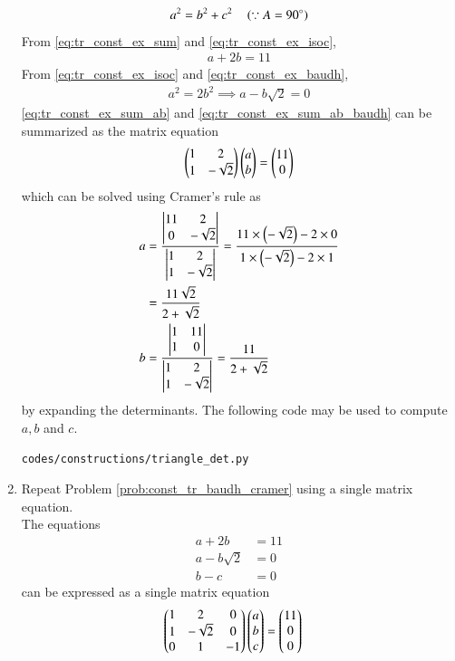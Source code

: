 \begin{enumerate}[label=\arabic*.,ref=\thesubsection.\theenumi]
\begin{align}
a^2 = b^2+c^2 \quad \left(\because A = 90\degree\right)
\label{eq:tr_const_ex_baudh}
\end{align}
%
From \eqref{eq:tr_const_ex_sum} and \eqref{eq:tr_const_ex_isoc},
\begin{align}
\label{eq:tr_const_ex_sum_ab}
a + 2b = 11
\end{align}
From  \eqref{eq:tr_const_ex_isoc} and \eqref{eq:tr_const_ex_baudh},
\begin{align}
\label{eq:tr_const_ex_sum_ab_baudh}
a^2 = 2b^2 \implies a - b\sqrt{2} =0
\end{align}
\eqref{eq:tr_const_ex_sum_ab} and \eqref{eq:tr_const_ex_sum_ab_baudh}
can be summarized as the matrix equation 
\begin{align}
\label{eq:tr_const_ex_sum_ab_mat}
\begin{pmatrix}1 & 2\\1 & -\sqrt{2}\end{pmatrix}\begin{pmatrix}a\\b\end{pmatrix} = \begin{pmatrix}11\\0\end{pmatrix}
\end{align}
%
which can be solved using Cramer's rule as
\begin{align}
\label{eq:tr_const_ex_sum_ab_mat_sol}
a &= \frac{\begin{vmatrix}11 & 2\\0 & -\sqrt{2}\end{vmatrix}}{\begin{vmatrix}1 & 2\\1 & -\sqrt{2}\end{vmatrix}} = \frac{11 \times \left(-\sqrt{2}\right)-2\times 0}{1\times \left(-\sqrt{2}\right) - 2 \times 1} 
\\
&= \frac{11\sqrt{2}}{2+\sqrt{2}}
\\
b &= \frac{\begin{vmatrix}1 & 11\\1 & 0\end{vmatrix}}{\begin{vmatrix}1 & 2\\1 & -\sqrt{2}\end{vmatrix}} = \frac{11}{2+\sqrt{2}}
\end{align}
%
by expanding the determinants.  The following code may be used to compute $a, b$ and $c$.
\begin{lstlisting}
codes/constructions/triangle_det.py
\end{lstlisting}
\item Repeat Problem \ref{prob:const_tr_baudh_cramer} using a single matrix equation.
\\
\solution The equations 
\begin{align}
\label{eq:tr_const_ex_sum_abc}
a + 2b &= 11
\\
a - b\sqrt{2} &=0
\\
b-c &=0
\end{align}
can be expressed as a single matrix equation
\begin{align}
\label{eq:tr_const_ex_sum_abc_mat}
\myvec{1 & 2 & 0\\1 & -\sqrt{2} & 0\\0 & 1 & -1} \myvec{a\\b\\c} &= \myvec{11\\0\\0}

\end{align}
\end{enumerate}
